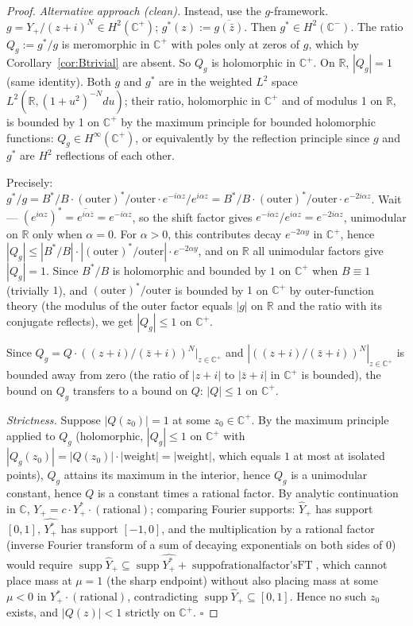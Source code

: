 \documentclass[11pt]{article}
\theoremstyle{definition}
\newcommand{\R}{\mathbb{R}}
\newcommand{\C}{\mathbb{C}}
\newcommand{\Cp}{\C^{+}}
\newcommand{\Cm}{\C^{-}}
\newcommand{\supp}{\operatorname{supp}}
\begin{document}
\begin{proof}
\emph{Alternative approach (clean).} Instead, use the $g$-framework. $g=Y_+/(z+i)^N\in H^2(\Cp)$; $g^*(z):=\overline{g(\bar z)}$. Then $g^*\in H^2(\Cm)$. The ratio $Q_g:=g^*/g$ is meromorphic in $\Cp$ with poles only at zeros of $g$, which by Corollary~\ref{cor:Btrivial} are absent. So $Q_g$ is holomorphic in $\Cp$. On $\R$, $|Q_g|=1$ (same identity). Both $g$ and $g^*$ are in the weighted $L^2$ space $L^2(\R,(1+u^2)^{-N}du)$; their ratio, holomorphic in $\Cp$ and of modulus 1 on $\R$, is bounded by 1 on $\Cp$ by the maximum principle for bounded holomorphic functions: $Q_g\in H^\infty(\Cp)$, or equivalently by the reflection principle since $g$ and $g^*$ are $H^2$ reflections of each other.

Precisely: $g^*/g=B^*/B\cdot(\text{outer})^*/\text{outer}\cdot e^{-i\alpha z}/e^{i\alpha z}=B^*/B\cdot(\text{outer})^*/\text{outer}\cdot e^{-2i\alpha z}$. Wait — $(e^{i\alpha z})^*=\overline{e^{i\alpha\bar z}}=e^{-i\alpha z}$, so the shift factor gives $e^{-i\alpha z}/e^{i\alpha z}=e^{-2i\alpha z}$, unimodular on $\R$ only when $\alpha=0$. For $\alpha>0$, this contributes decay $e^{-2\alpha y}$ in $\Cp$, hence $|Q_g|\le |B^*/B|\cdot|(\text{outer})^*/\text{outer}|\cdot e^{-2\alpha y}$, and on $\R$ all unimodular factors give $|Q_g|=1$. Since $B^*/B$ is holomorphic and bounded by $1$ on $\Cp$ when $B\equiv 1$ (trivially $1$), and $(\text{outer})^*/\text{outer}$ is bounded by $1$ on $\Cp$ by outer-function theory (the modulus of the outer factor equals $|g|$ on $\R$ and the ratio with its conjugate reflects), we get $|Q_g|\le 1$ on $\Cp$.

Since $Q_g=Q\cdot((z+i)/(\bar z+i))^N|_{z\in\Cp}$ and $|((z+i)/(\bar z+i))^N|_{z\in\Cp}$ is bounded away from zero (the ratio of $|z+i|$ to $|\bar z+i|$ in $\Cp$ is bounded), the bound on $Q_g$ transfers to a bound on $Q$: $|Q|\le 1$ on $\Cp$.

\emph{Strictness.} Suppose $|Q(z_0)|=1$ at some $z_0\in\Cp$. By the maximum principle applied to $Q_g$ (holomorphic, $|Q_g|\le 1$ on $\Cp$ with $|Q_g(z_0)|=|Q(z_0)|\cdot|\text{weight}|=|\text{weight}|$, which equals $1$ at most at isolated points), $Q_g$ attains its maximum in the interior, hence $Q_g$ is a unimodular constant, hence $Q$ is a constant times a rational factor. By analytic continuation in $\C$, $Y_+=c\cdot Y_+^*\cdot(\text{rational})$; comparing Fourier supports: $\hat Y_+$ has support $[0,1]$, $\hat{Y_+^*}$ has support $[-1,0]$, and the multiplication by a rational factor (inverse Fourier transform of a sum of decaying exponentials on both sides of $0$) would require $\supp\hat Y_+\subseteq\supp\hat{Y_+^*}+\operatorname{supp of rational factor's FT}$, which cannot place mass at $\mu=1$ (the sharp endpoint) without also placing mass at some $\mu<0$ in $Y_+^*\cdot(\text{rational})$, contradicting $\supp\hat Y_+\subseteq[0,1]$. Hence no such $z_0$ exists, and $|Q(z)|<1$ strictly on $\Cp$. $\square$
\end{proof}
\end{document}
